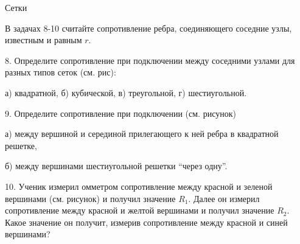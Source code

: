\documentclass[14pt]{article}
\begin{document}
\vspace{5mm}
{\large{Сетки}}
\vspace{3mm}

В задачах 8-10 считайте сопротивление ребра, соединяющего соседние узлы, известным и равным $r$.

8. Определите сопротивление при подключении между соседними узлами для разных типов сеток (см. рис):

а) квадратной,
\hspace{2cm}
б) кубической,
\hspace{2cm}
в) треугольной,
\hspace{2cm}
г) шестиугольной.

9. Определите сопротивление при подключении (см. рисунок)

а) между вершиной и серединой прилегающего к ней ребра в квадратной решетке,

б) между вершинами шестиугольной решетки ``через одну''.

10. Ученик измерил омметром сопротивление между красной и зеленой вершинами (см. рисунок) и получил значение $R_1$. Далее он измерил сопротивление между красной и желтой вершинами и получил значение $R_2$. Какое значение он получит, измерив сопротивление между красной и синей вершинами?
\end{document}
